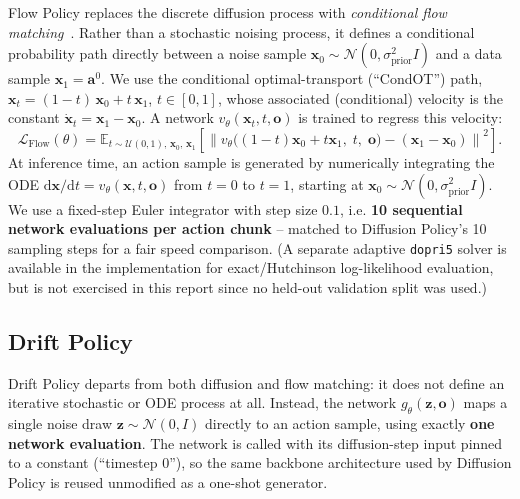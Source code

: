 \documentclass[11pt]{article}
\begin{document}
Flow Policy replaces the discrete diffusion process with \emph{conditional
flow matching}~\cite{lipman2023flow}. Rather than a stochastic noising
process, it defines a conditional probability path directly between a noise
sample $\mathbf{x}_0\sim\mathcal{N}(0,\sigma_{\text{prior}}^2 I)$ and a data
sample $\mathbf{x}_1=\mathbf{a}^0$. We use the conditional optimal-transport
(``CondOT'') path, $\mathbf{x}_t = (1-t)\,\mathbf{x}_0 + t\,\mathbf{x}_1$,
$t\in[0,1]$, whose associated (conditional) velocity is the constant
$\dot{\mathbf{x}}_t = \mathbf{x}_1-\mathbf{x}_0$. A network
$v_\theta(\mathbf{x}_t, t, \mathbf{o})$ is trained to regress this velocity:
\begin{equation}
\mathcal{L}_{\text{Flow}}(\theta) = \mathbb{E}_{t\sim\mathcal{U}(0,1),\,\mathbf{x}_0,\,\mathbf{x}_1}
\left[\left\| v_\theta\big((1-t)\mathbf{x}_0+t\mathbf{x}_1,\; t,\; \mathbf{o}\big)
- (\mathbf{x}_1-\mathbf{x}_0) \right\|^2\right].
\end{equation}
At inference time, an action sample is generated by numerically integrating
the ODE $\mathrm{d}\mathbf{x}/\mathrm{d}t = v_\theta(\mathbf{x},t,\mathbf{o})$
from $t=0$ to $t=1$, starting at $\mathbf{x}_0\sim\mathcal{N}(0,\sigma_{\text{prior}}^2I)$.
We use a fixed-step Euler integrator with step size $0.1$, i.e. \textbf{10
sequential network evaluations per action chunk} -- matched to Diffusion
Policy's 10 sampling steps for a fair speed comparison. (A separate adaptive
\texttt{dopri5} solver is available in the implementation for exact/Hutchinson
log-likelihood evaluation, but is not exercised in this report since no
held-out validation split was used.)

\subsection{Drift Policy}
\label{sec:drift}

Drift Policy departs from both diffusion and flow matching: it does not
define an iterative stochastic or ODE process at all. Instead, the network
$g_\theta(\mathbf{z}, \mathbf{o})$ maps a single noise draw
$\mathbf{z}\sim\mathcal{N}(0,I)$ directly to an action sample, using exactly
\textbf{one network evaluation}. The network is called with its diffusion-step
input pinned to a constant (``timestep 0''), so the same backbone architecture
used by Diffusion Policy is reused unmodified as a one-shot generator.
\end{document}
